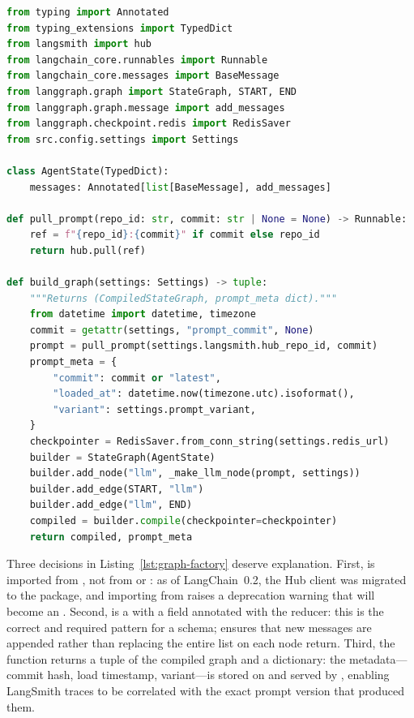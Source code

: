 \begin{lstlisting}[language=Python,
  caption={Graph factory with typed state, prompt pull, and feature-flag ---
    \texttt{src/graph/factory.py}},
  label={lst:graph-factory}]
from typing import Annotated
from typing_extensions import TypedDict
from langsmith import hub
from langchain_core.runnables import Runnable
from langchain_core.messages import BaseMessage
from langgraph.graph import StateGraph, START, END
from langgraph.graph.message import add_messages
from langgraph.checkpoint.redis import RedisSaver
from src.config.settings import Settings

class AgentState(TypedDict):
    messages: Annotated[list[BaseMessage], add_messages]

def pull_prompt(repo_id: str, commit: str | None = None) -> Runnable:
    ref = f"{repo_id}:{commit}" if commit else repo_id
    return hub.pull(ref)

def build_graph(settings: Settings) -> tuple:
    """Returns (CompiledStateGraph, prompt_meta dict)."""
    from datetime import datetime, timezone
    commit = getattr(settings, "prompt_commit", None)
    prompt = pull_prompt(settings.langsmith.hub_repo_id, commit)
    prompt_meta = {
        "commit": commit or "latest",
        "loaded_at": datetime.now(timezone.utc).isoformat(),
        "variant": settings.prompt_variant,
    }
    checkpointer = RedisSaver.from_conn_string(settings.redis_url)
    builder = StateGraph(AgentState)
    builder.add_node("llm", _make_llm_node(prompt, settings))
    builder.add_edge(START, "llm")
    builder.add_edge("llm", END)
    compiled = builder.compile(checkpointer=checkpointer)
    return compiled, prompt_meta
\end{lstlisting}

Three decisions in Listing~\ref{lst:graph-factory} deserve explanation.
First,  is imported from , not from
 or : as of LangChain~0.2, the Hub
client was migrated to the  package, and importing from
 raises a deprecation warning that will become an
. Second,  is a  with a
 field annotated with the  reducer: this
is the correct and required pattern for a  schema;
 ensures that new messages are appended rather than
replacing the entire list on each node return. Third, the function returns a
tuple of the compiled graph and a  dictionary: the
metadata---commit hash, load timestamp, variant---is stored on
 and served by , enabling
LangSmith traces to be correlated with the exact prompt version that produced
them.

